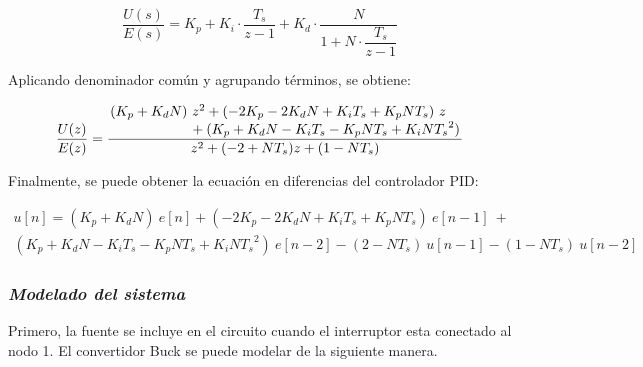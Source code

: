 \vspace{-0.5cm}
\begin{equation}
    \dfrac{U(s)}{E(s)} = K_p + K_i \cdot \dfrac{T_s}{z-1} + K_d \cdot \dfrac{N}{1+N \cdot \dfrac{T_s}{z-1}}
\end{equation}
\vspace{-0.5cm}

Aplicando denominador común y agrupando términos, se obtiene:

\vspace{-0.5cm}
\begin{equation}
    \dfrac{U(z)}{E(z)} =
    \frac
    {
        \splitfrac{
            (K_p + K_d N)\ z^2 + (-2 K_p - 2 K_d N + K_i T_s + K_p N T_s)\ z
        }{
            + (K_p + K_d N - K_i T_s - K_p N T_s + K_i N {T_s}^2)
        }
    }
    {
            z^2 + (-2 + N T_s) z + (1 - N T_s)
    }
    \end{equation}
\vspace{-0.5cm}

Finalmente, se puede obtener la ecuación en diferencias del controlador PID:

\vspace{-0.5cm}
\begin{multline}
        u[n] = (K_p + K_d N)\ e[n] + (-2 K_p - 2 K_d N + K_i T_s + K_p N T_s)\ e[n-1]\  + \\
    (K_p + K_d N - K_i T_s - K_p N T_s + K_i N {T_s}^2)\ e[n-2] - (2 - N T_s)\ u[n-1] - (1 - N T_s)\ u[n-2]
\end{multline}
\vspace{-0.5cm}


\subsubsection*{\it{Modelado del sistema}}
\vspace{-0.25cm}
Primero, la fuente se incluye en el circuito cuando el interruptor esta conectado al nodo 1.
El convertidor Buck se puede modelar de la siguiente manera.

